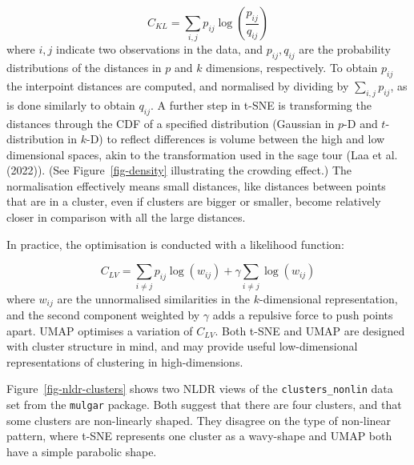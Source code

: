 \documentclass[
  letterpaper,
]{krantz}
\begin{document}
\[
C_{KL} = \sum_{i,j} p_{ij}\log\left(\frac{p_{ij}}{q_{ij}}\right)
\] where \(i,j\) indicate two observations in the data, and
\(p_{ij}, q_{ij}\) are the probability distributions of the distances in
\(p\) and \(k\) dimensions, respectively. To obtain \(p_{ij}\) the
interpoint distances are computed, and normalised by dividing by
\(\sum_{i,j} p_{ij}\), as is done similarly to obtain \(q_{ij}\). A
further step in t-SNE is transforming the distances through the CDF of a
specified distribution (Gaussian in \(p\)-D and \(t\)-distribution in
\(k\)-D) to reflect differences is volume between the high and low
dimensional spaces, akin to the transformation used in the sage tour
(Laa et al. (2022)). (See Figure~\ref{fig-density} illustrating the
crowding effect.) The normalisation effectively means small distances,
like distances between points that are in a cluster, even if clusters
are bigger or smaller, become relatively closer in comparison with all
the large distances.

In practice, the optimisation is conducted with a likelihood function:

\[
C_{LV} = \sum_{i \neq j} p_{ij} \log\left(w_{ij}\right) + \gamma \sum_{i \neq j} \log\left(w_{ij}\right)
\] where \(w_{ij}\) are the unnormalised similarities in the
\(k\)-dimensional representation, and the second component weighted by
\(\gamma\) adds a repulsive force to push points apart. UMAP optimises a
variation of \(C_{LV}\). Both t-SNE and UMAP are designed with cluster
structure in mind, and may provide useful low-dimensional
representations of clustering in high-dimensions.

Figure~\ref{fig-nldr-clusters} shows two NLDR views of the
\texttt{clusters\_nonlin} data set from the \texttt{mulgar} package.
Both suggest that there are four clusters, and that some clusters are
non-linearly shaped. They disagree on the type of non-linear pattern,
where t-SNE represents one cluster as a wavy-shape and UMAP both have a
simple parabolic shape.
\end{document}
